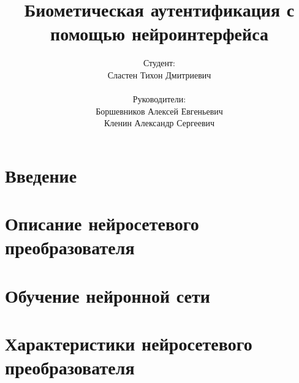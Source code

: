 \documentclass{beamer}
\title{Биометическая аутентификация с помощью нейроинтерфейса}
\author{
    Студент: \\ Сластен Тихон Дмитриевич \\ \\
    Руководители: \\ Боршевников Алексей Евгеньевич \\ Кленин Александр Сергеевич}
\institute{Б8303а Прикладная математика и информатика}
\date{}
\begin{document}
\maketitle

\section{Введение}





\section{Описание нейросетевого преобразователя}




\section{Обучение нейронной сети}



\section{Характеристики нейросетевого преобразователя}

\end{document}
